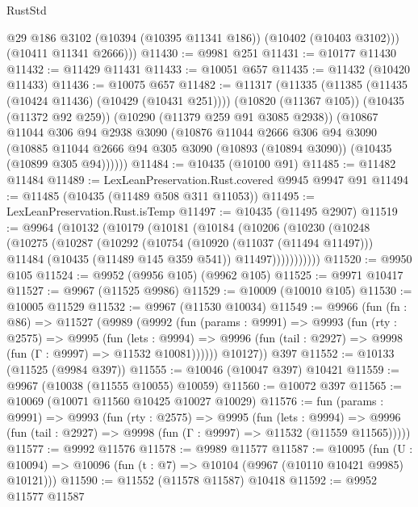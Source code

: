 \begin{lexlean}{RustStd}
\begin{coremodule}
          @29
          @186
          @3102
          (@10394 (@10395 @11341 @186))
          (@10402 (@10403 @3102)))
        (@10411 @11341 @2666)))
@11430 := @9981 @251
@11431 := @10177 @11430
@11432 := @11429 @11431
@11433 := @10051 @657
@11435 := @11432 (@10420 @11433)
@11436 := @10075 @657
@11482 := @11317
    (@11335
      (@11385 (@11435 (@10424 @11436) (@10429 (@10431 @251))))
      (@10820 (@11367 @105))
      (@10435 (@11372 @92 @259))
      (@10290 (@11379 @259 @91 @3085 @2938))
      (@10867
        @11044
        @306
        @94
        @2938
        @3090
        (@10876
          @11044
          @2666
          @306
          @94
          @3090
          (@10885 @11044 @2666 @94 @305 @3090 (@10893 (@10894 @3090)) (@10435 (@10899 @305 @94))))))
@11484 := @10435 (@10100 @91)
@11485 := @11482 @11484
@11489 := LexLeanPreservation.Rust.covered @9945 @9947 @91
@11494 := @11485 (@10435 (@11489 @508 @311 @11053))
@11495 := LexLeanPreservation.Rust.isTemp
@11497 := @10435 (@11495 @2907)
@11519 := @9964
    (@10132
      (@10179
        (@10181
          (@10184
            (@10206
              (@10230
                (@10248
                  (@10275
                    (@10287
                      (@10292
                        (@10754
                          (@10920 (@11037 (@11494 @11497)))
                          @11484
                          (@10435 (@11489 @145 @359 @541))
                          @11497)))))))))))
@11520 := @9950 @105
@11524 := @9952 (@9956 @105) (@9962 @105)
@11525 := @9971 @10417
@11527 := @9967 (@11525 @9986)
@11529 := @10009 (@10010 @105)
@11530 := @10005 @11529
@11532 := @9967 (@11530 @10034)
@11549 := @9966
    (fun (fn : @86) =>
    @11527
      (@9989
        (@9992
          (fun (params : @9991) =>
          @9993
            (fun (rty : @2575) =>
            @9995
              (fun (lets : @9994) =>
              @9996 (fun (tail : @2927) => @9998 (fun (Γ : @9997) => @11532 @10081))))))
        @10127))
    @397
@11552 := @10133 (@11525 (@9984 @397))
@11555 := @10046 (@10047 @397) @10421
@11559 := @9967 (@10038 (@11555 @10055) @10059)
@11560 := @10072 @397
@11565 := @10069 (@10071 @11560 @10425 @10027 @10029)
@11576 := fun (params : @9991) =>
  @9993
    (fun (rty : @2575) =>
    @9995
      (fun (lets : @9994) =>
      @9996 (fun (tail : @2927) => @9998 (fun (Γ : @9997) => @11532 (@11559 @11565)))))
@11577 := @9992 @11576
@11578 := @9989 @11577
@11587 := @10095
    (fun (U : @10094) => @10096 (fun (t : @7) => @10104 (@9967 (@10110 @10421 @9985) @10121)))
@11590 := @11552 (@11578 @11587) @10418
@11592 := @9952 @11577 @11587

\end{coremodule}
\end{lexlean}

